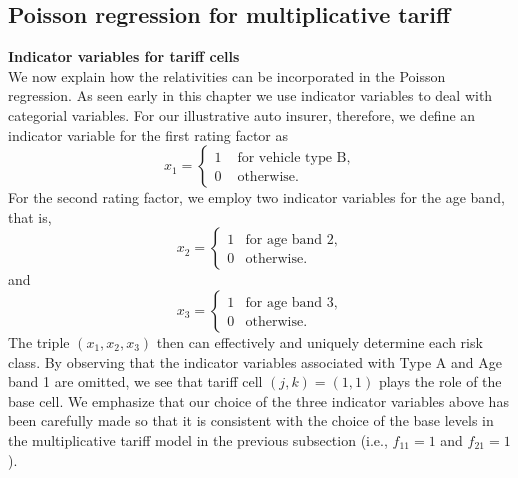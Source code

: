 \documentclass[12pt]{article}
\begin{document}

\subsection{Poisson regression for multiplicative tariff}
\noindent\textbf{Indicator variables for tariff cells}\\
We now explain how the relativities can be incorporated in the Poisson regression. As seen early in this chapter we use indicator variables to deal with categorial variables. For our illustrative auto insurer, therefore, we define an indicator variable for the first rating factor as
\begin{equation}
\label{ind.x1}\nonumber
x_1=
\begin{cases}
      1 & \text{ for vehicle type B}, \\
      0 & \text{ otherwise}.
\end{cases}
\end{equation} 
For the second rating factor, we employ two indicator variables for the age band, that is,
\begin{equation}
\label{ind.x2}\nonumber
x_2=
\begin{cases}
     1 & \text{for age band 2}, \\
     0 & \text{otherwise}.
\end{cases}
\end{equation} and 
\begin{equation}
\label{ind.x3}\nonumber
x_3=
\begin{cases}
     1 & \text{for age band 3}, \\
     0 & \text{otherwise}.
\end{cases}
\end{equation} The triple $(x_1, x_2, x_3)$ then can effectively and uniquely determine each risk class. By observing that the indicator variables associated with Type A and Age band 1 are omitted, we see that tariff cell $(j,k)=(1,1)$ plays the role of the base cell. We emphasize that our choice of the three indicator variables above has been carefully made so that it is consistent with the choice of the base levels in the multiplicative tariff model in the previous subsection (i.e., $f_{11}=1$ and $f_{21}=1$).\\
%
%
\end{document}
